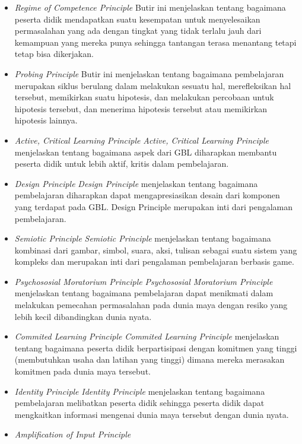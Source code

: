 	\begin{itemize}
		\item \textit{Regime of Competence Principle}
			\subitem Butir ini menjelaskan tentang bagaimana peserta didik mendapatkan suatu kesempatan untuk menyelesaikan permasalahan yang ada dengan tingkat yang tidak terlalu jauh dari kemampuan yang mereka punya sehingga tantangan terasa menantang tetapi tetap bisa dikerjakan.
		\item \textit{Probing Principle}
			\subitem Butir ini menjelaskan tentang bagaimana pembelajaran merupakan siklus berulang dalam melakukan sesuatu hal, merefleksikan hal tersebut, memikirkan suatu hipotesis, dan melakukan percobaan untuk hipotesis tersebut, dan menerima hipotesis tersebut atau memikirkan hipotesis lainnya.
		\item \textit{Active, Critical Learning Principle}
			\subitem \textit{Active, Critical Learning Principle} menjelaskan tentang bagaimana aspek dari GBL diharapkan membantu peserta didik untuk lebih aktif, kritis dalam pembelajaran.
		\item \textit{Design Principle}
			\subitem \textit{Design Principle} menjelaskan tentang bagaimana pembelajaran diharapkan dapat mengapresiasikan desain dari komponen yang terdapat pada GBL. Design Principle merupakan inti dari pengalaman pembelajaran.
		\item \textit{Semiotic Principle}
			\subitem \textit{Semiotic Principle} menjelaskan tentang bagaimana kombinasi dari gambar, simbol, suara, aksi, tulisan sebagai suatu sistem yang kompleks dan merupakan inti dari pengalaman pembelajaran berbasis game.
		\item \textit{Psychososial Moratorium Principle}
			\subitem \textit{Psychososial Moratorium Principle} menjelaskan tentang bagaimana pembelajaran dapat menikmati dalam melakukan pemecahan permasalahan pada dunia maya dengan resiko yang lebih kecil dibandingkan dunia nyata.
		\item \textit{Commited Learning Principle}
			\subitem \textit{Commited Learning Principle} menjelaskan tentang bagaimana peserta didik berpartisipasi dengan komitmen yang tinggi (membutuhkan usaha dan latihan yang tinggi) dimana mereka merasakan komitmen pada dunia maya tersebut.
		\item \textit{Identity Principle}
			\subitem \textit{Identity Principle} menjelaskan tentang bagaimana pembelajaran melibatkan peserta didik sehingga peserta didik dapat mengkaitkan informasi mengenai dunia maya tersebut dengan dunia nyata.
		\item \textit{Amplification of Input Principle}

\end{itemize}
